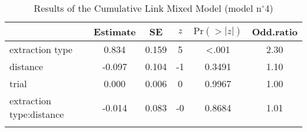 \begin{table}
\begin{tabular}{l S[table-format=-1.3] S[table-format=1.3] S[table-format=-1] S[table-format=<1.4] S[table-format=1.2]}
  \lsptoprule
 & {Estimate} & {SE} & {$z$} & {$\text{Pr}(>|z|)$} & {Odd.ratio} \\ 
  \midrule
  extraction type          & 0.834  & 0.159 & 5  & <.001  & 2.30 \\ 
  distance                 & -0.097 & 0.104 & -1 & 0.3491 & 1.10 \\ 
  trial                    & 0.000  & 0.006 & 0  & 0.9967 & 1.00 \\ 
  extraction type:distance & -0.014 & 0.083 & -0 & 0.8684 & 1.01 \\ 
   \lspbottomrule
\end{tabular}
\caption{Results of the Cumulative Link Mixed Model (model n$^{\circ}$4)}
\label{tab:exp1-m4}
\end{table}
